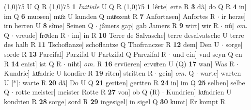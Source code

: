 \documentclass[8pt,a4paper,notitlepage]{article}
\begin{document}
\begin{table}[ht]
\begin{minipage}[t]{0.5\linewidth}
\scriptsize
\line(1,0){75} \newline
U Q R \newline
\line(1,0){75} \newline
\textbf{1} \textit{Initiale} U Q R  \newline
\line(1,0){75} \newline
\textbf{1} lêrte] erte R \textbf{3} dâ] do Q R \textbf{4} in] im Q \textbf{6} muosen] muͦz U kunden Q muͯszent R \textbf{7} Anfortasen] Anfortes R  $\cdot$ ir herze] irn herren U \textbf{8} sîme] Seinen Q  $\cdot$ jâmers gap] gab Jamers R \textbf{9} wirt] wir R  $\cdot$ nû] \textit{om.} Q  $\cdot$ vreude] froͯden R  $\cdot$ im] in R \textbf{10} Terre de Salvasche] terre desalvatsche U terre des halb R \textbf{11} Tschoflanze] schoflantze Q Thofranczer R \textbf{12} dem] Den U  $\cdot$ sorge] sorde R \textbf{13} Parcifal] Parzifal U Partzifal Q Parczifal R  $\cdot$ und ein] vnd seyn Q en R \textbf{14} enist] ist Q R  $\cdot$ niht] \textit{om.} R \textbf{16} ervüeren] ervuͦren U (Q) \textbf{17} wan] Was R  $\cdot$ Kundrie] kuͦndrie U kondire R \textbf{19} riten] stritten R  $\cdot$ gein] \textit{om.} Q  $\cdot$ warte] warten U [*]: warte R \textbf{20} dâ] Do U Q \textbf{21} geriten] gertten R \textbf{24} in] im Q \textbf{25} selben] selbe Q  $\cdot$ rotte meister] meister Rotte R \textbf{27} von] ob Q (R)  $\cdot$ Kundrien] kuͦndrien U kondrien R \textbf{28} sorge] sord R \textbf{29} ingesigel] in sigel Q \textbf{30} kumt] Er kompt R \newline
\end{minipage}
\end{table}
\end{document}
